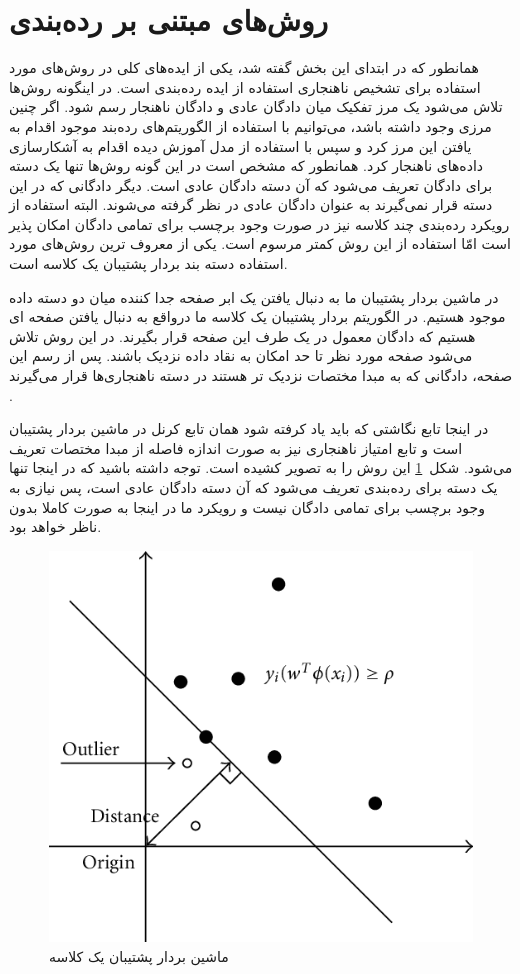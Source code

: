 \documentclass[12pt,a4paper]{report}
\theoremstyle{definition}
\theoremstyle{definition}
\begin{document}
\section{روش‌های مبتنی بر رده‌بندی}
همانطور که در ابتدای این بخش گفته شد، یکی از ایده‌های کلی در روش‌های مورد استفاده برای تشخیص ناهنجاری استفاده از ایده رده‌بندی است. در اینگونه روش‌ها تلاش می‌شود یک مرز تفکیک میان دادگان عادی و دادگان ناهنجار رسم شود. اگر چنین مرزی وجود داشته باشد، می‌توانیم با استفاده از الگوریتم‌های رده‌بند موجود اقدام به یافتن این مرز کرد و سپس با استفاده از مدل آموزش دیده اقدام به آشکارسازی داده‌های ناهنجار کرد. همانطور که مشخص است در این گونه روش‌ها تنها یک دسته برای دادگان تعریف می‌شود که آن دسته دادگان عادی است. دیگر دادگانی که در این دسته قرار نمی‌گیرند به عنوان دادگان عادی در نظر گرفته می‌شوند. البته استفاده از رویکرد رده‌بندی چند کلاسه نیز در صورت وجود برچسب برای تمامی دادگان امکان پذیر است امّا استفاده از این روش کمتر مرسوم است. یکی از معروف ترین روش‌های مورد استفاده دسته بند بردار پشتیبان یک کلاسه است.

در ماشین بردار پشتیبان ما به دنبال یافتن یک ابر صفحه جدا کننده میان دو دسته داده موجود هستیم. در الگوریتم بردار پشتیبان یک کلاسه ما درواقع به دنبال یافتن صفحه ای هستیم که دادگان معمول در یک طرف این صفحه قرار بگیرند. در این روش تلاش می‌شود صفحه مورد نظر تا حد امکان به نقاد داده نزدیک باشند. پس از رسم این صفحه، دادگانی که به مبدا مختصات نزدیک تر هستند در دسته ناهنجاری‌ها قرار می‌گیرند \cite{10.5555/3009657.3009740}.

در اینجا تابع نگاشتی که باید یاد کرفته شود همان تابع کرنل در ماشین بردار پشتیبان است و تابع امتیاز ناهنجاری نیز به صورت اندازه فاصله از مبدا مختصات تعریف می‌شود. شکل~\ref{fig:one-class-svm} این روش را به تصویر کشیده است. توجه داشته باشید که در اینجا تنها یک دسته برای رده‌بندی تعریف می‌شود که آن دسته دادگان عادی است، پس نیازی به وجود برچسب برای تمامی دادگان نیست و رویکرد ما در اینجا به صورت کاملا بدون ناظر خواهد بود.
\begin{figure}[!h]
	\begin{center}
		\includegraphics[width=0.5\linewidth]{./images/figures/one-class-svm.png}
	\end{center}
	\caption{ماشین بردار پشتیبان یک کلاسه}
	\label{fig:one-class-svm}
	\centering
\end{figure}
\end{document}
